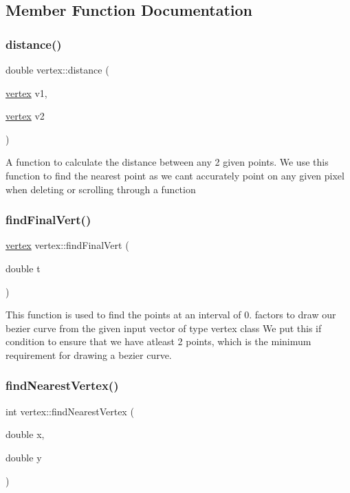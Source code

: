 \subsection{Member Function Documentation}
\mbox{\label{classvertex_a805e0de0af85470e4fbf698d71e6c122}} 
\subsubsection{\texorpdfstring{distance()}{distance()}}
{\footnotesize\ttfamily double vertex\+::distance (\begin{DoxyParamCaption}\item[{\hyperlink{classvertex}{vertex}}]{v1,  }\item[{\hyperlink{classvertex}{vertex}}]{v2 }\end{DoxyParamCaption})}

A function to calculate the distance between any 2 given points. We use this function to find the nearest point as we can\textquotesingle{}t accurately point on any given pixel when deleting or scrolling through a function \mbox{\label{classvertex_ab5af4e5840d9caf5599cb51e69c078ef}} 
\subsubsection{\texorpdfstring{find\+Final\+Vert()}{findFinalVert()}}
{\footnotesize\ttfamily \hyperlink{classvertex}{vertex} vertex\+::find\+Final\+Vert (\begin{DoxyParamCaption}\item[{double}]{t }\end{DoxyParamCaption})}

This function is used to find the points at an interval of 0. factors to draw our bezier curve from the given input vector of type vertex class We put this if condition to ensure that we have atleast 2 points, which is the minimum requirement for drawing a bezier curve. \mbox{\label{classvertex_a2e1c5ac0589fae95a9e62f6685037fe6}} 
\subsubsection{\texorpdfstring{find\+Nearest\+Vertex()}{findNearestVertex()}}
{\footnotesize\ttfamily int vertex\+::find\+Nearest\+Vertex (\begin{DoxyParamCaption}\item[{double}]{x,  }\item[{double}]{y }\end{DoxyParamCaption})}

